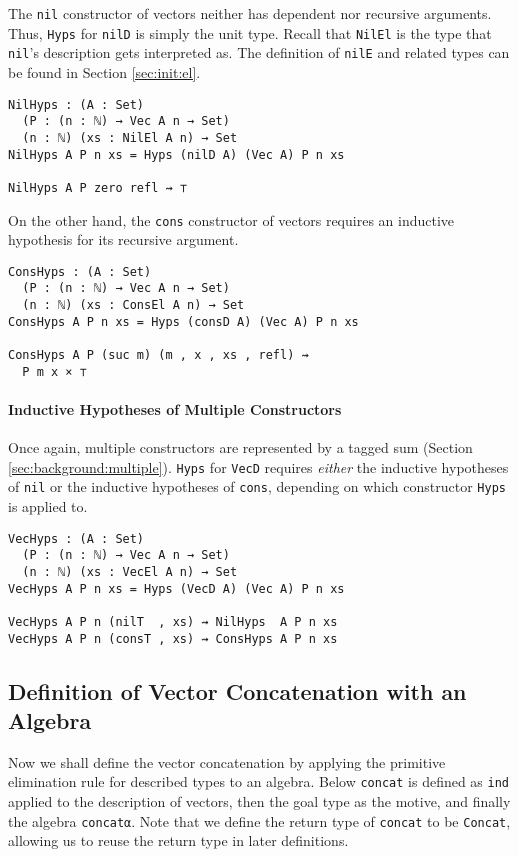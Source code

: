 \documentclass[preprint,nonatbib]{sigplanconf}
\newcommand{\refsec}[1]{Section \ref{sec:#1}}
\begin{document}
The {\tt nil} constructor of vectors neither has dependent nor
recursive arguments. Thus, {\tt Hyps} for {\tt nilD} is simply
the unit type. Recall that {\tt NilEl} is the type that
{\tt nil}'s description gets interpreted as. The definition of
{\tt nilE} and related types can be found in \refsec{init:el}.

\begin{verbatim}
NilHyps : (A : Set)
  (P : (n : ℕ) → Vec A n → Set)
  (n : ℕ) (xs : NilEl A n) → Set
NilHyps A P n xs = Hyps (nilD A) (Vec A) P n xs

NilHyps A P zero refl ⇝ ⊤
\end{verbatim}

On the other hand, the {\tt cons} constructor of vectors requires an
inductive hypothesis for its recursive argument.

\begin{verbatim}
ConsHyps : (A : Set)
  (P : (n : ℕ) → Vec A n → Set)
  (n : ℕ) (xs : ConsEl A n) → Set
ConsHyps A P n xs = Hyps (consD A) (Vec A) P n xs

ConsHyps A P (suc m) (m , x , xs , refl) ⇝
  P m x × ⊤
\end{verbatim}

\paragraph{Inductive Hypotheses of Multiple Constructors}

Once again, multiple constructors are represented by a tagged
sum (\refsec{background:multiple}). {\tt Hyps} for
{\tt VecD} requires {\it either} the inductive hypotheses of
{\tt nil} or the inductive hypotheses of {\tt cons}, depending on
which constructor {\tt Hyps} is applied to.

\begin{verbatim}
VecHyps : (A : Set)
  (P : (n : ℕ) → Vec A n → Set)
  (n : ℕ) (xs : VecEl A n) → Set
VecHyps A P n xs = Hyps (VecD A) (Vec A) P n xs

VecHyps A P n (nilT  , xs) ⇝ NilHyps  A P n xs 
VecHyps A P n (consT , xs) ⇝ ConsHyps A P n xs 
\end{verbatim}

\subsection{Definition of Vector Concatenation with an Algebra}

Now we shall define the vector concatenation by applying the primitive
elimination rule for described types to an algebra. Below
{\tt concat} is defined as {\tt ind} applied to the description of
vectors, then the goal type as the motive, and finally the algebra
{\tt concatα}.
Note that we define the return type of
{\tt concat} to be {\tt Concat}, allowing us to reuse the return type
in later definitions.
\end{document}
